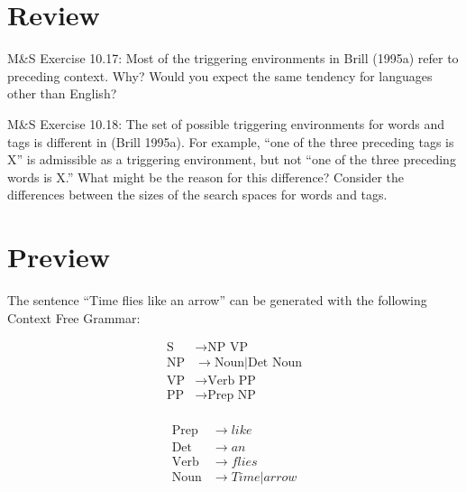 \documentclass[11pt,letterpaper,boxed]{hmcpset}
\begin{document}
\section*{Review} 
 
\begin{problem}
M\&S Exercise 10.17: Most of the triggering environments in Brill
(1995a) refer to preceding context. Why? Would you expect the same
tendency for languages other than English?
\end{problem}
\begin{solution}
\vspace{8cm}
\end{solution}

\begin{problem}
M\&S Exercise 10.18: The set of possible triggering environments for
words and tags is different in (Brill 1995a). For example, ``one of
the three preceding tags is X'' is admissible as a triggering
environment, but not ``one of the three preceding words is X.'' What
might be the reason for this difference? Consider the differences
between the sizes of the search spaces for words and tags. 
\end{problem}
\begin{solution}
\vspace{8cm}
\end{solution}

\pagebreak

\section*{Preview} 
The sentence ``Time flies like an arrow'' can be generated with the
following Context Free Grammar:
\begin{multicols}{2}

\begin{align*}
    \text{S} & \to \text{NP VP} \\
    \text{NP} & \to \text{Noun} | \text{Det Noun} \\
    \text{VP} & \to \text{Verb PP} \\
    \text{PP} & \to \text{Prep NP} \\
\end{align*}

\begin{align*}
    \text{Prep} & \to like \\
    \text{Det} & \to an \\
    \text{Verb} & \to flies \\
    \text{Noun} & \to Time | arrow \\
\end{align*}    

\end{multicols}
\end{document}
